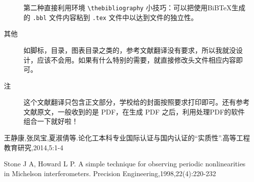 \documentclass[11pt,a4paper]{article}
\newcommand{\wuhao}{\fontsize{10.5pt}{18pt}\selectfont}
\newcommand\seccontent{
	\wuhao %
    \setlength{\parindent}{2em} %
    \setlength{\parskip}{0pt}
    }
\theoremstyle{definition} \newtheorem{law}[thm]{Law}
\theoremstyle{plain} \newtheorem{jury}[thm]{Jury}
\theoremstyle{remark} \newtheorem*{marg}{Margaret}
\numberwithin{equation}{section}
\begin{document}
\begin{description}
	第二种直接利用环境 \verb*|\thebibliography| 小技巧：可以把使用BiB\TeX 生成的 \verb*|.bbl| 文件内容粘到 \verb*|.tex| 文件中以达到文件的独立性。
	
	\item[其他] 如脚标，目录，图表目录之类的，参考文献翻译没有要求，所以我就没设计，应该不会用。如果有什么特别的需要，就直接修改头文件相应内容即可。
	
	\item[注] 这个文献翻译只包含正文部分，学校给的封面按照要求打印即可。还有参考文献原文，一般收到的是 PDF，在生成 PDF 之后，利用处理PDF的软件组合一下就好啦！
\end{description}

\appendix
{}

\label{bibtexref}

\begin{thebibliography}{1}
	\label{latexref}
	\seccontent
	 王静康,张凤宝,夏淑倩等.论化工本科专业国际认证与国内认证的“实质性”.高等工程教育研究,2014,5:1-4

	 Stone J A, Howard L P. A simple technique for observing periodic nonlinearities in Michelson interferometers. Precision Engineering,1998,22(4):220-232

\end{thebibliography}
%	
\end{document}
